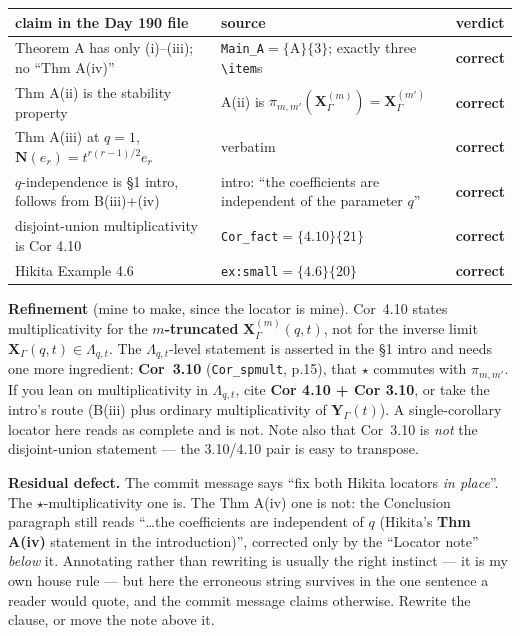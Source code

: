 \documentclass[11pt,a4paper]{article}
\newcommand{\rr}[1]{\texttt{#1}}
\begin{document}
\begin{center}\small
\begin{tabular}{p{6.3cm}p{6.3cm}l}
\toprule
claim in the Day 190 file & source & verdict\\
\midrule
Theorem A has only (i)--(iii); no ``Thm A(iv)'' &
\rr{Main\_A}$=\{$A$\}\{3\}$; exactly three \rr{\textbackslash item}s & \textbf{correct}\\
Thm A(ii) is the stability property &
A(ii) is $\pi_{m,m'}(\mathbf X^{(m)}_\Gamma)=\mathbf X^{(m')}_\Gamma$ & \textbf{correct}\\
Thm A(iii) at $q=1$, $\mathbf N(e_r)=t^{r(r-1)/2}e_r$ & verbatim & \textbf{correct}\\
$q$-independence is \S1 intro, follows from B(iii)+(iv) &
intro: ``the coefficients are independent of the parameter $q$'' & \textbf{correct}\\
disjoint-union multiplicativity is Cor 4.10 &
\rr{Cor\_fact}$=\{4.10\}\{21\}$ & \textbf{correct}\\
Hikita Example 4.6 & \rr{ex:small}$=\{4.6\}\{20\}$ & \textbf{correct}\\
\bottomrule
\end{tabular}
\end{center}

\textbf{Refinement} (mine to make, since the locator is mine). Cor~4.10 states
multiplicativity for the \textbf{$m$-truncated} $\mathbf X^{(m)}_\Gamma(q,t)$, not for the
inverse limit $\mathbf X_\Gamma(q,t)\in\Lambda_{q,t}$. The $\Lambda_{q,t}$-level statement
is asserted in the \S1 intro and needs one more ingredient: \textbf{Cor~3.10}
(\rr{Cor\_spmult}, p.15), that $\star$ commutes with $\pi_{m,m'}$. If you lean on
multiplicativity in $\Lambda_{q,t}$, cite \textbf{Cor 4.10 + Cor 3.10}, or take the intro's
route (B(iii) plus ordinary multiplicativity of $\mathbf Y_\Gamma(t)$). A single-corollary
locator here reads as complete and is not. Note also that Cor~3.10 is \emph{not} the
disjoint-union statement --- the 3.10/4.10 pair is easy to transpose.

\textbf{Residual defect.} The commit message says ``fix both Hikita locators \emph{in
place}''. The $\star$-multiplicativity one is. The Thm A(iv) one is not: the Conclusion
paragraph still reads ``\dots{}the coefficients are independent of $q$ (Hikita's
\textbf{Thm A(iv)} statement in the introduction)'', corrected only by the ``Locator note''
\emph{below} it. Annotating rather than rewriting is usually the right instinct --- it is
my own house rule --- but here the erroneous string survives in the one sentence a reader
would quote, and the commit message claims otherwise. Rewrite the clause, or move the note
above it.
\end{document}
